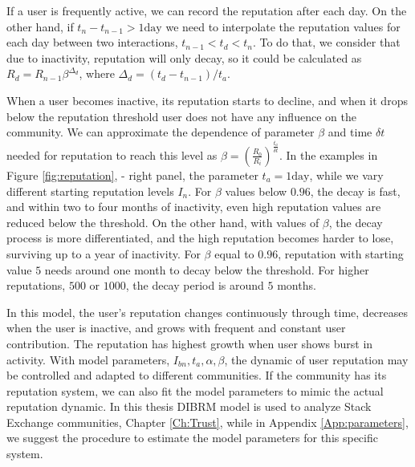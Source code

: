 If a user is frequently active, we can record the reputation after each day. On the other hand, if $t_n-t_{n-1}>1 \text{day}$ we need to interpolate the reputation values for each day between two interactions, $t_{n-1}<t_d<t_{n}$. To do that, we consider that due to inactivity, reputation will only decay, so it could be calculated as $R_d = R_{n-1}\beta^{\Delta_d}$, where $\Delta_d=(t_{d}-t_{n-1})/t_a$. 

When a user becomes inactive, its reputation starts to decline, and when it drops below the reputation threshold user does not have any influence on the community. We can approximate the dependence of parameter $\beta$ and time $\delta t$ needed for reputation to reach this level as $\beta = (\frac{R_0}{R_i})^{\frac{t_a}{\delta t}}$. In the examples in Figure \ref{fig:reputation}, - right panel, the parameter $t_a=1\text{day}$, while we vary different starting reputation levels $I_n$.   
For $\beta$ values below $0.96$, the decay is fast, and within two to four months of inactivity, even high reputation values are
reduced below the threshold. On the other hand, with values of $\beta$, the decay process is more differentiated, and the high
reputation becomes harder to lose, surviving up to a year of inactivity. For $\beta$ equal to $0.96$, reputation with starting value $5$ needs around one month to decay below the threshold. For higher reputations, $500$ or $1000$, the decay period is around $5$ months. 

In this model, the user's reputation changes continuously through time, decreases when the user is inactive, and grows with frequent and constant user contribution. The reputation has highest growth when user shows burst in activity. With model parameters, $I_{bn}, t_a, \alpha, \beta$, the dynamic of user reputation may be controlled and adapted to different communities. If the community has its reputation system, we can also fit the model parameters to mimic the actual reputation dynamic. In this thesis DIBRM model is used to analyze Stack Exchange communities, Chapter \ref{Ch:Trust}, while in Appendix \ref{App:parameters}, we suggest the procedure to estimate the model parameters for this specific system. 














